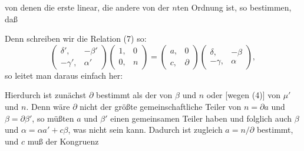 von denen die erste linear, die andere von der $n$ten Ordnung ist,
so bestimmen, daß


Denn schreiben wir die Relation (7) so:
\[
\begin{pmatrix} \delta', & -\beta' \\ -\gamma', & \alpha' \end{pmatrix}\begin{pmatrix} 1, & 0 \\ 0, & n \end{pmatrix} = \begin{pmatrix} a, & 0 \\ c, & \partial \end{pmatrix}\begin{pmatrix} \delta, & -\beta \\ -\gamma, & \alpha \end{pmatrix},
\]
so leitet man daraus einfach her:


Hierdurch ist zunächst $\partial$ bestimmt als der  von $\beta$ und $n$ oder [wegen (4)] von $\mu'$ und $n$. Denn wäre
$\partial$ nicht der größte gemeinschaftliche Teiler von $n=\partial a$ und
$\beta=\partial\beta'$, so müßten $a$ und $\beta'$ einen gemeinsamen Teiler
haben und folglich auch $\beta$ und $\alpha=\alpha a'+c\beta$, was nicht sein
kann. Dadurch ist zugleich $a=n/\partial$ bestimmt, und $c$ muß der Kongruenz

